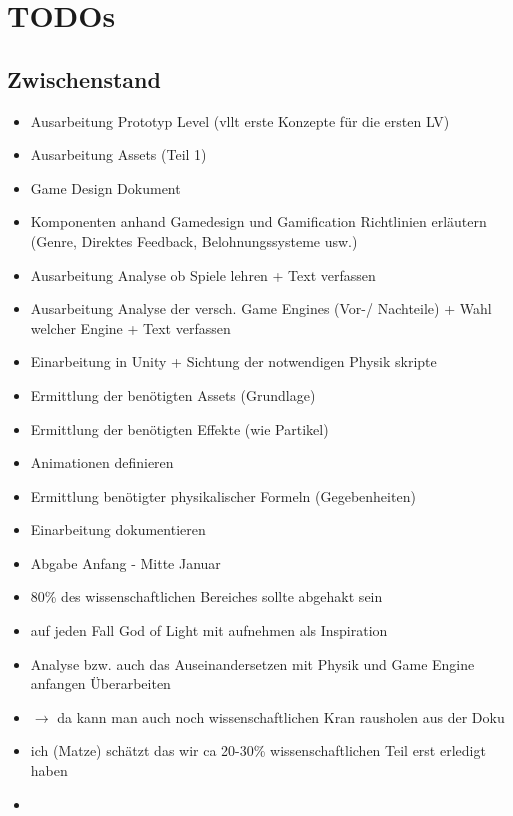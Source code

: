 \section{TODOs}

\subsection{Zwischenstand}
\begin{itemize}
\item Ausarbeitung Prototyp Level (vllt erste Konzepte für die ersten LV)
\item Ausarbeitung Assets (Teil 1)
\item Game Design Dokument
\item Komponenten anhand Gamedesign und Gamification Richtlinien erläutern (Genre, Direktes Feedback, Belohnungssysteme usw.)
\item Ausarbeitung Analyse ob Spiele lehren + Text verfassen
\item Ausarbeitung Analyse der versch. Game Engines (Vor-/ Nachteile) + Wahl welcher Engine + Text verfassen

\item Einarbeitung in Unity + Sichtung der notwendigen Physik skripte
\item Ermittlung der benötigten Assets (Grundlage)
\item Ermittlung der benötigten Effekte (wie Partikel)
\item Animationen definieren
\item Ermittlung benötigter physikalischer Formeln (Gegebenheiten)
\item Einarbeitung dokumentieren



\item Abgabe Anfang - Mitte Januar
\item 80\% des wissenschaftlichen Bereiches sollte abgehakt sein
\item auf jeden Fall God of Light mit aufnehmen als Inspiration
\item Analyse bzw. auch das Auseinandersetzen mit Physik und Game Engine anfangen Überarbeiten
\item $\rightarrow$ da kann man auch noch wissenschaftlichen Kran rausholen aus der Doku
\item ich (Matze) schätzt das wir ca 20-30\% wissenschaftlichen Teil erst erledigt haben
\item
\end{itemize}

